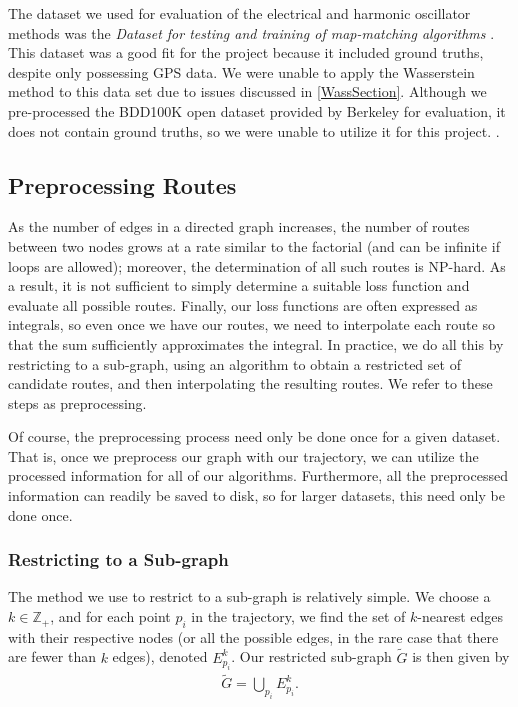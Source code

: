 \documentclass{article}
\numberwithin{equation}{section}
\theoremstyle{definition}
\newcommand{\Z}{\mathbb{Z}}
\begin{document}
The dataset we used for evaluation of the electrical and harmonic oscillator methods was the \textit{Dataset for testing and training of map-matching algorithms} \cite{KCMMN}. This dataset was a good fit for the project because it included ground truths, despite only possessing GPS data. We were unable to apply the Wasserstein method to this data set due to issues discussed in \autoref{WassSection}.  Although we pre-processed the BDD100K open dataset provided by Berkeley for evaluation, it does not contain ground truths, so we were unable to utilize it for this project.  \cite{yuBDD100KDiverseDriving2020}. 

\subsection{Preprocessing Routes}

As the number of edges in a directed graph increases, the number of routes between two nodes grows at a rate similar to the factorial (and can be infinite if loops are allowed); moreover, the determination of all such routes is NP-hard. As a result, it is not sufficient to simply determine a suitable loss function and evaluate all possible routes. Finally, our loss functions are often expressed as integrals, so even once we have our routes, we need to interpolate each route so that the sum sufficiently approximates the integral. In practice, we do all this by restricting to a sub-graph, using an algorithm to obtain a restricted set of candidate routes, and then interpolating the resulting routes. We refer to these steps as preprocessing.

Of course, the preprocessing process need only be done once for a given dataset. That is, once we preprocess our graph with our trajectory, we can utilize the processed information for all of our algorithms. Furthermore, all the preprocessed information can readily be saved to disk, so for larger datasets, this need only be done once.

\subsubsection{Restricting to a Sub-graph}
\label{ssub:restrict-to-a-subgraph}

The method we use to restrict to a sub-graph is relatively simple. We choose a $k \in \Z_+$, and for each point $p_i$ in the trajectory, we find the set of $k$-nearest edges with their respective nodes (or all the possible edges, in the rare case that there are fewer than $k$ edges), denoted $E_{p_i}^k$. Our restricted sub-graph $\tilde{G}$ is then given by
\begin{align}
    \tilde{G} = \bigcup_{p_i} E_{p_i}^k.
\end{align}
\end{document}
